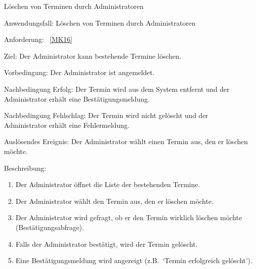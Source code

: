 \begin{function}{40}{Löschen von Terminen durch Administratoren}
    \item[Anwendungsfall:] Löschen von Terminen durch Administratoren
    \item[Anforderung:] ~\ref{MK16}
    \item[Ziel:] Der Administrator kann bestehende Termine löschen.
    \item[Vorbedingung:] Der Administrator ist angemeldet.
    \item[Nachbedingung Erfolg:] Der Termin wird aus dem System entfernt und der Administrator erhält eine Bestätigungsmeldung.
    \item[Nachbedingung Fehlschlag:] Der Termin wird nicht gelöscht und der Administrator erhält eine Fehlermeldung.
    \item[Auslösendes Ereignis:] Der Administrator wählt einen Termin aus, den er löschen möchte.
    \item[Beschreibung:] ~
    \begin{enumerate}
        \item Der Administrator öffnet die Liste der bestehenden Termine.
        \item Der Administrator wählt den Termin aus, den er löschen möchte.
        \item Der Administrator wird gefragt, ob er den Termin wirklich löschen möchte (Bestätigungsabfrage).
        \item Falls der Administrator bestätigt, wird der Termin gelöscht.
        \item Eine Bestätigungsmeldung wird angezeigt (z.B.\ `Termin erfolgreich gelöscht').
    \end{enumerate}
\end{function}

\pagebreak


